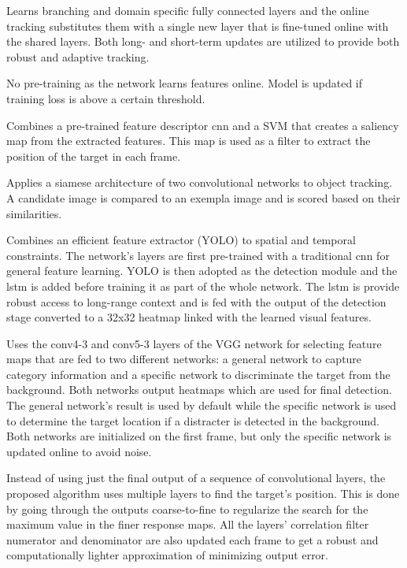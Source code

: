 \cite{MULTI_DOMAIN}
Learns branching and domain specific fully connected layers and the online tracking
substitutes them with a single new layer that is fine-tuned online with the shared
layers. Both long- and short-term updates are utilized to provide both robust and
adaptive tracking.

\cite{DEEPTRACK}
No pre-training as the network learns features online. Model is updated if training
loss is above a certain threshold.

\cite{DISCR_SALIENCY}
Combines a pre-trained feature descriptor \ac{cnn} and a SVM that creates a
saliency map from the extracted features. This map is used as a filter to extract
the position of the target in each frame.

\cite{SIAM_TRACK}
Applies a siamese architecture of two convolutional networks to object tracking.
A candidate image is compared to an exempla image and is scored based on their
similarities.

\cite{SPAT_RCN}
Combines an efficient feature extractor (YOLO) to spatial and temporal constraints.
The network's layers are first pre-trained with a traditional \ac{cnn} for general
feature learning. YOLO is then adopted as the detection module and the \ac{lstm}
is added before training it as part of the whole network. The \ac{lstm} is provide
robust access to long-range context and is fed with the output of the detection
stage converted to a 32x32 heatmap linked with the learned visual features.

\cite{FCN_TRACK_2}
Uses the conv4-3 and conv5-3 layers of the VGG network for selecting feature maps
that are fed to two different networks: a general network to capture category information
and a specific network to discriminate the target from the background. Both networks
output heatmaps which are used for final detection. The general network's result is used
by default while the specific network is used to determine the target location if
a distracter is detected in the background. Both networks are initialized on the first
frame, but only the specific network is updated online to avoid noise.

\cite{HIERARCH_FEATS}
Instead of using just the final output of a sequence of convolutional layers, the
proposed algorithm uses multiple layers to find the target's position. This is done
by going through the outputs coarse-to-fine to regularize the search for the maximum
value in the finer response maps. All the layers' correlation filter numerator and
denominator are also updated each frame to get a robust and computationally lighter
approximation of minimizing output error.

